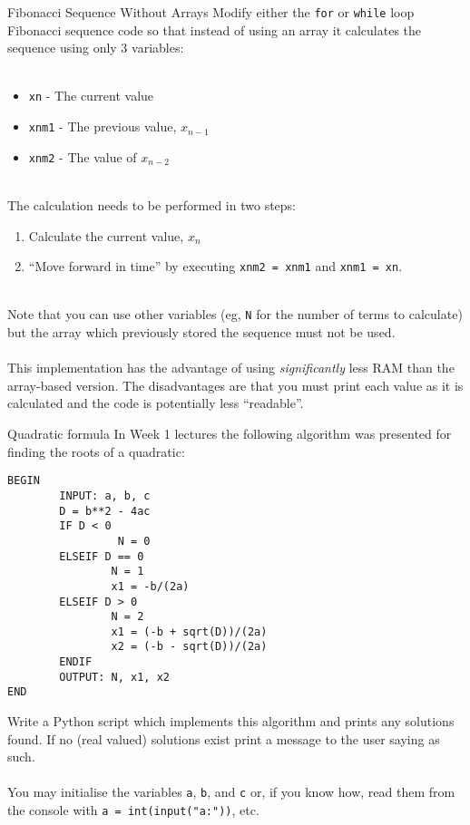 \documentclass{lab}
\begin{document}
\begin{task}{Fibonacci Sequence Without Arrays}{}
Modify either the \texttt{for} or \texttt{while} loop Fibonacci sequence code so that instead of using an array it calculates the sequence using only 3 variables:
\\~
\begin{itemize}
\item \texttt{xn} - The current value
\item \texttt{xnm1} - The previous value, $x_{n-1}$
\item \texttt{xnm2} - The value of $x_{n-2}$
\end{itemize}
~\\
The calculation needs to be performed in two steps:
\\
\begin{enumerate}
\item Calculate the current value, $x_n$
\item ``Move forward in time'' by executing \texttt{xnm2 = xnm1} and \texttt{xnm1 = xn}.
\end{enumerate}
~\\
Note that you can use other variables (eg, \texttt{N} for the number of terms to calculate) but the array which previously stored the sequence must not be used.
\\~\\
This implementation has the advantage of using \textit{significantly} less RAM than the array-based version. The disadvantages are that you must print each value as it is calculated and the code is potentially less ``readable''.
\end{task}\label{task:noArray}

\begin{task}{Quadratic formula}{}
In Week 1 lectures the following algorithm was presented for finding the roots of a quadratic:
\begin{lstlisting}[style=pseudo]
BEGIN
        INPUT: a, b, c
        D = b**2 - 4ac
        IF D < 0
                 N = 0
        ELSEIF D == 0
                N = 1
                x1 = -b/(2a)
        ELSEIF D > 0
                N = 2
                x1 = (-b + sqrt(D))/(2a)
                x2 = (-b - sqrt(D))/(2a)
        ENDIF
        OUTPUT: N, x1, x2
END
\end{lstlisting}
Write a Python script which implements this algorithm and prints any solutions found. If no (real valued) solutions exist print a message to the user saying as such.
\\~\\
You may initialise the variables \texttt{a}, \texttt{b}, and \texttt{c} or, if you know how, read them from the console with \texttt{a = int(input("a:"))}, etc.
\end{task}
\end{document}
